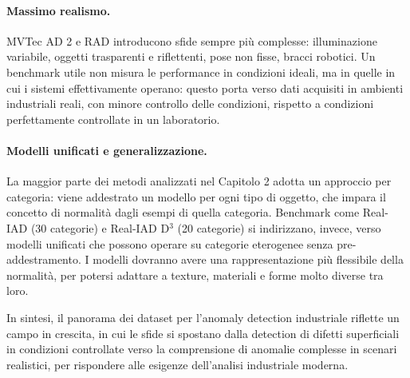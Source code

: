 \paragraph{Massimo realismo.}
MVTec AD 2 e RAD introducono sfide sempre più complesse: illuminazione variabile, oggetti trasparenti e riflettenti, pose non fisse, bracci robotici. Un benchmark utile non misura le performance in condizioni ideali, ma in quelle in cui i sistemi effettivamente operano: questo porta verso dati acquisiti in ambienti industriali reali, con minore controllo delle condizioni, rispetto a condizioni perfettamente controllate in un laboratorio.

\paragraph{Modelli unificati e generalizzazione.}
La maggior parte dei metodi analizzati nel Capitolo 2 adotta un approccio per categoria: viene addestrato un modello per ogni tipo di oggetto, che impara il concetto di normalità dagli esempi di quella categoria. Benchmark come Real-IAD (30 categorie) e Real-IAD D$^3$ (20 categorie) si indirizzano, invece, verso modelli unificati che possono operare su categorie eterogenee senza pre-addestramento. I modelli dovranno avere una rappresentazione più flessibile della normalità, per potersi adattare a texture, materiali e forme molto diverse tra loro. 


\medskip
In sintesi, il panorama dei dataset per l'anomaly detection industriale riflette un campo in crescita, in cui le sfide si spostano dalla detection di difetti superficiali in condizioni controllate verso la comprensione di anomalie complesse in scenari realistici, per rispondere alle esigenze dell’analisi industriale moderna.

